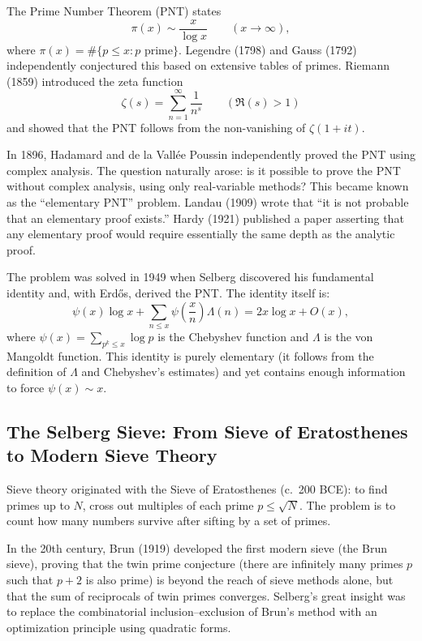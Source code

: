 The Prime Number Theorem (PNT) states
\[
\pi(x) \sim \frac{x}{\log x} \qquad (x \to \infty),
\]
where \(\pi(x) = \#\{p \leq x : p \text{ prime}\}\). Legendre (1798) and Gauss (1792) independently conjectured this based on extensive tables of primes. Riemann (1859) introduced the zeta function
\[
\zeta(s) = \sum_{n=1}^{\infty} \frac{1}{n^s} \qquad (\Re(s) > 1)
\]
and showed that the PNT follows from the non-vanishing of \(\zeta(1+it)\).

In 1896, Hadamard and de la Vall\'ee Poussin independently proved the PNT using complex analysis. The question naturally arose: is it possible to prove the PNT without complex analysis, using only real-variable methods? This became known as the ``elementary PNT'' problem. Landau (1909) wrote that ``it is not probable that an elementary proof exists.'' Hardy (1921) published a paper asserting that any elementary proof would require essentially the same depth as the analytic proof.

The problem was solved in 1949 when Selberg discovered his fundamental identity and, with Erd\H{o}s, derived the PNT. The identity itself is:
\[
\psi(x) \log x + \sum_{n \leq x} \psi\!\left(\frac{x}{n}\right) \Lambda(n) = 2x \log x + O(x),
\]
where \(\psi(x) = \sum_{p^k \leq x} \log p\) is the Chebyshev function and \(\Lambda\) is the von Mangoldt function. This identity is purely elementary (it follows from the definition of \(\Lambda\) and Chebyshev's estimates) and yet contains enough information to force \(\psi(x) \sim x\).

\subsection{The Selberg Sieve: From Sieve of Eratosthenes to Modern Sieve Theory}

Sieve theory originated with the Sieve of Eratosthenes (c.\ 200 BCE): to find primes up to \(N\), cross out multiples of each prime \(p \leq \sqrt{N}\). The problem is to count how many numbers survive after sifting by a set of primes.

In the 20th century, Brun (1919) developed the first modern sieve (the Brun sieve), proving that the twin prime conjecture (there are infinitely many primes \(p\) such that \(p+2\) is also prime) is beyond the reach of sieve methods alone, but that the sum of reciprocals of twin primes converges. Selberg's great insight was to replace the combinatorial inclusion--exclusion of Brun's method with an optimization principle using quadratic forms.

